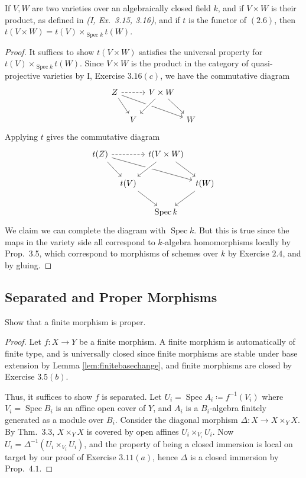 \documentclass[10pt]{article}
\theoremstyle{definition}
\theoremstyle{remark}
\numberwithin{equation}{section}
\numberwithin{figure}{subsubsection}
\DeclareMathOperator{\Spec}{Spec}
\begin{document}
\begin{problem}
  If $V,W$ are two varieties over an algebraically closed field $k$, and if $V \times W$ is their product, as defined in \emph{(I, Ex.~3.15, 3.16)}, and if $t$ is the functor of $(2.6)$, then $t(V \times W) = t(V) \times_{\Spec k} t(W)$.
\end{problem}
\begin{proof}
  It suffices to show $t(V \times W)$ satisfies the universal property for $t(V) \times_{\Spec k} t(W)$. Since $V \times W$ is the product in the category of quasi-projective varieties by I, Exercise $3.16(c)$, we have the commutative diagram
  \begin{equation*}
    \begin{tikzcd}[column sep=tiny]
      Z \arrow[dashed]{rr}\arrow{drrr}\arrow{dr}& & V \times W\arrow[crossing over]{dl}\arrow{dr}\\
      & V & & W
    \end{tikzcd}
  \end{equation*}
  Applying $t$ gives the commutative diagram
  \begin{equation*}
    \begin{tikzcd}[column sep=tiny]
      t(Z) \arrow[dashed]{rr}\arrow{drrr}\arrow{dr}& & t(V \times W)\arrow[crossing over]{dl}\arrow{dr}\\
      & t(V)\arrow{dr} & & t(W)\arrow{dl}\\
      & & \Spec k
    \end{tikzcd}
  \end{equation*}
  We claim we can complete the diagram with $\Spec k$. But this is true since the maps in the variety side all correspond to $k$-algebra homomorphisms locally by Prop.~3.5, which correspond to morphisms of schemes over $k$ by Exercise $2.4$, and by gluing.
\end{proof}

\subsection{Separated and Proper Morphisms}
\begin{problem}
  Show that a finite morphism is proper.
\end{problem}
\begin{proof}
  Let $f\colon X \to Y$ be a finite morphism. A finite morphism is automatically
  of finite type, and is universally closed since finite morphisms are stable
  under base extension by Lemma \ref{lem:finitebasechange}, and finite morphisms
  are closed by Exercise $3.5(b)$.
  \par Thus, it suffices to show $f$ is separated. Let $U_i = \Spec A_i \coloneqq
  f^{-1}(V_i)$ where $V_i = \Spec B_i$ is an affine open cover of $Y$, and $A_i$
  is a $B_i$-algebra finitely generated as a module over $B_i$. Consider the diagonal
  morphism $\Delta \colon X \to X \times_Y X$. By Thm.\ 3.3, $X \times_Y X$ is
  covered by open affines $U_i \times_{V_i} U_i$. Now $U_i = \Delta^{-1}(U_i
  \times_{V_i} U_i)$, and the property of being a closed immersion is local on
  target by our proof of Exercise $3.11(a)$, hence $\Delta$ is a closed
  immersion by Prop.\ $4.1$.
\end{proof}
\end{document}
